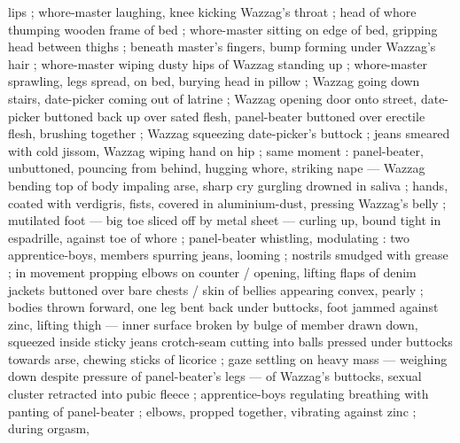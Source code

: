 lips ; whore-master laughing, knee kicking Wazzag's throat ; head of whore thumping wooden frame of bed ; whore-master sitting on edge of bed, gripping head between thighs ; beneath master's fingers, bump forming under Wazzag's hair  ; whore-master wiping dusty hips of Wazzag standing up  ; whore-master sprawling, legs spread, on bed, burying head in pillow  ; Wazzag going down stairs, date-picker coming out of latrine ; Wazzag opening door onto street, date-picker buttoned back up over sated flesh, panel-beater buttoned over erectile flesh, brushing together ; Wazzag squeezing date-picker's buttock  ; jeans smeared with cold jissom, Wazzag wiping hand on hip ; same moment : panel-beater, unbuttoned, pouncing from behind, hugging whore, striking nape --- Wazzag bending top of body {\dashcom} impaling arse, sharp cry gurgling drowned in saliva ; hands, coated with verdigris, fists, covered in aluminium-dust, pressing Wazzag's belly ; mutilated foot --- big toe sliced off by metal sheet --- curling up, bound tight in espadrille, against toe of whore ; panel-beater whistling, modulating : two apprentice-boys, members spurring jeans, looming ; nostrils smudged with grease ; in movement propping elbows on counter{\comdash} {\slash} opening, lifting flaps of denim jackets buttoned over bare chests {\slash} {\dashcom} skin of bellies appearing convex, pearly ; bodies thrown forward, one leg bent back under buttocks, foot jammed against zinc, lifting thigh --- inner surface broken by bulge of member drawn down, squeezed inside sticky jeans {\dashcom} crotch-seam cutting into balls pressed under buttocks towards arse, chewing sticks of licorice ; gaze settling on heavy mass --- weighing down despite pressure of panel-beater's legs --- of Wazzag's buttocks, sexual cluster retracted into pubic fleece ; apprentice-boys regulating breathing with panting of panel-beater ; elbows, propped together, vibrating against zinc ; during orgasm, %
